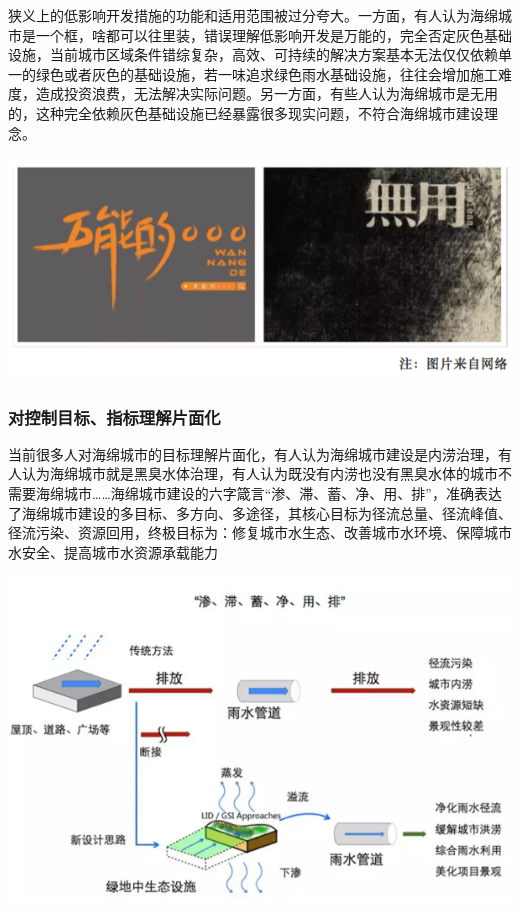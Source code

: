 \documentclass[
]{book}
\begin{document}
狭义上的低影响开发措施的功能和适用范围被过分夸大。一方面，有人认为海绵城市是一个框，啥都可以往里装，错误理解低影响开发是万能的，完全否定灰色基础设施，当前城市区域条件错综复杂，高效、可持续的解决方案基本无法仅仅依赖单一的绿色或者灰色的基础设施，若一味追求绿色雨水基础设施，往往会增加施工难度，造成投资浪费，无法解决实际问题。另一方面，有些人认为海绵城市是无用的，这种完全依赖灰色基础设施已经暴露很多现实问题，不符合海绵城市建设理念。

\includegraphics[width=8.33in]{images/hm3}

\hypertarget{ux5bf9ux63a7ux5236ux76eeux6807ux6307ux6807ux7406ux89e3ux7247ux9762ux5316}{%
\subsubsection{对控制目标、指标理解片面化}\label{ux5bf9ux63a7ux5236ux76eeux6807ux6307ux6807ux7406ux89e3ux7247ux9762ux5316}}

当前很多人对海绵城市的目标理解片面化，有人认为海绵城市建设是内涝治理，有人认为海绵城市就是黑臭水体治理，有人认为既没有内涝也没有黑臭水体的城市不需要海绵城市\ldots\ldots 海绵城市建设的六字箴言``渗、滞、蓄、净、用、排''，准确表达了海绵城市建设的多目标、多方向、多途径，其核心目标为径流总量、径流峰值、径流污染、资源回用，终极目标为：修复城市水生态、改善城市水环境、保障城市水安全、提高城市水资源承载能力

\includegraphics[width=8.33in]{images/hm4}
\end{document}
